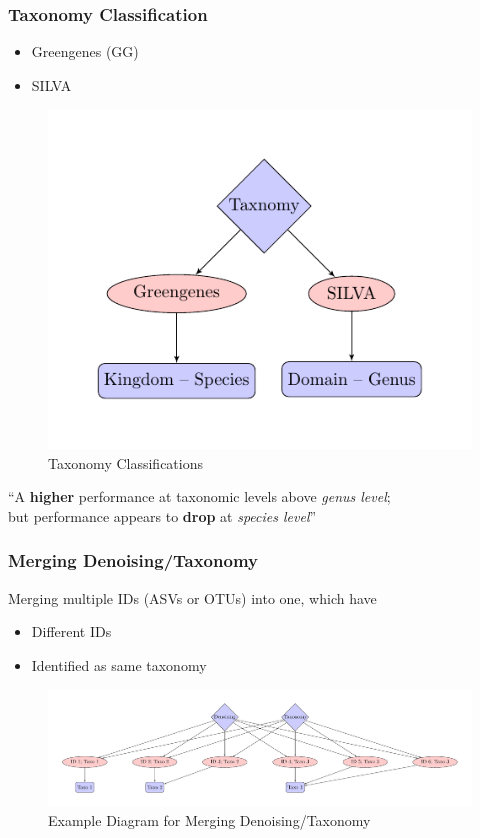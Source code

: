 \documentclass{beamer}
\begin{document}
    \begin{frame}
        \frametitle{Taxonomy Classification}

        \begin{itemize}
            \item Greengenes (GG) \cite{greengenes1}
            \item SILVA \cite{silva1, silva2}
        \end{itemize}

        \begin{figure}
            \includegraphics[width=0.4 \linewidth]{figures/tikz/taxonomy.pdf}
            \caption{Taxonomy Classifications}
        \end{figure}

        “A \textbf{higher} performance at taxonomic levels above \textit{genus level}; \\
        but performance appears to \textbf{drop} at \textit{species level}” \cite{performance1}
    \end{frame}

    \begin{frame}
        \frametitle{Merging Denoising/Taxonomy}

        Merging multiple IDs (ASVs or OTUs) into one, which have
        \begin{itemize}
            \item Different IDs
            \item Identified as same taxonomy
        \end{itemize}

        \begin{figure}
            \includegraphics[width=0.8 \linewidth]{figures/tikz/merging.pdf}
            \caption{Example Diagram for Merging Denoising/Taxonomy}
        \end{figure}
    \end{frame}
\end{document}
